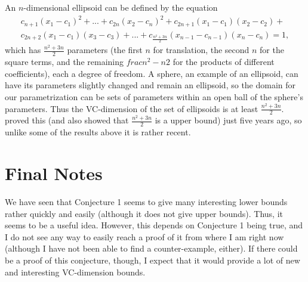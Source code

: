 \documentclass[12pt]{amsart}
\newcommand{\0}{\mat{0}}
\newcommand{\1}{\mathds{1}}
\begin{document}
An $n$-dimensional ellipsoid can be defined by the equation
\begin{multline*}
c_{n + 1}(x_1 - c_1)^2 + ... + c_{2n}(x_2 - c_n)^2 + c_{2n + 1}(x_1 - c_1)(x_2 - c_2) + \\
c_{2n + 2}(x_1 - c_1)(x_3 - c_3) + ... + c_{\frac{n^2 + 3n}{2}}(x_{n - 1} - c_{n - 1})(x_n - c_n) = 1,
\end{multline*}
which has $\frac{n^2 + 3n}{2}$ parameters (the first $n$ for translation, the second $n$ for the square terms, and the remaining $frac{n^2 - n}{2}$ for the products of different coefficients), each a degree of freedom. A sphere, an example of an ellipsoid, can have its parameters slightly changed and remain an ellipsoid, so the domain for our parametrization can be sets of parameters within an open ball of the sphere's parameters. Thus the VC-dimension of the set of ellipsoids is at least $\frac{n^2 + 3n}{2}.$ \citep{ellipsoids} proved this (and also showed that $\frac{n^2 + 3n}{2}$ is a upper bound) just five years ago, so unlike some of the results above it is rather recent.

\section{Final Notes}

We have seen that Conjecture 1 seems to give many interesting lower bounds rather quickly and easily (although it does not give upper bounds). Thus, it seems to be a useful idea. However, this depends on Conjecture 1 being true, and I do not see any way to easily reach a proof of it from where I am right now (although I have not been able to find a counter-example, either). If there could be a proof of this conjecture, though, I expect that it would provide a lot of new and interesting VC-dimension bounds.

 

\end{document}
